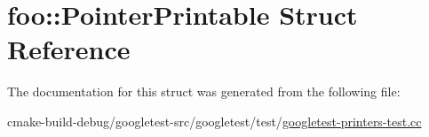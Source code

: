 \hypertarget{structfoo_1_1PointerPrintable}{}\section{foo\+::Pointer\+Printable Struct Reference}
\label{structfoo_1_1PointerPrintable}


The documentation for this struct was generated from the following file\+:\begin{DoxyCompactItemize}
\item 
cmake-\/build-\/debug/googletest-\/src/googletest/test/\mbox{\hyperlink{googletest-printers-test_8cc}{googletest-\/printers-\/test.\+cc}}\end{DoxyCompactItemize}
